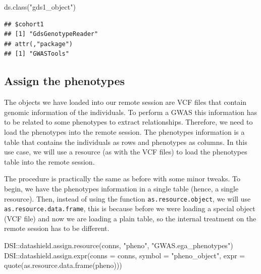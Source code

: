 \documentclass[
]{book}
\newenvironment{Shaded}{\begin{snugshade}}{\end{snugshade}}
\newcommand{\AttributeTok}[1]{\textcolor[rgb]{0.77,0.63,0.00}{#1}}
\newcommand{\FunctionTok}[1]{\textcolor[rgb]{0.00,0.00,0.00}{#1}}
\newcommand{\NormalTok}[1]{#1}
\newcommand{\SpecialCharTok}[1]{\textcolor[rgb]{0.00,0.00,0.00}{#1}}
\newcommand{\StringTok}[1]{\textcolor[rgb]{0.31,0.60,0.02}{#1}}
\begin{document}
\begin{Shaded}
\begin{Highlighting}[]
\FunctionTok{ds.class}\NormalTok{(}\StringTok{"gds1\_object"}\NormalTok{)}
\end{Highlighting}
\end{Shaded}

\begin{verbatim}
## $cohort1
## [1] "GdsGenotypeReader"
## attr(,"package")
## [1] "GWASTools"
\end{verbatim}

\hypertarget{assign-the-phenotypes}{%
\subsection{Assign the phenotypes}\label{assign-the-phenotypes}}

The objects we have loaded into our remote session are VCF files that contain genomic information of the individuals. To perform a GWAS this information has to be related to some phenotypes to extract relationships. Therefore, we need to load the phenotypes into the remote session. The phenotypes information is a table that contains the individuals as rows and phenotypes as columns. In this use case, we will use a resource (as with the VCF files) to load the phenotypes table into the remote session.

The procedure is practically the same as before with some minor tweaks. To begin, we have the phenotypes information in a single table (hence, a single resource). Then, instead of using the function \texttt{as.resource.object}, we will use \texttt{as.resource.data.frame}, this is because before we were loading a special object (VCF file) and now we are loading a plain table, so the internal treatment on the remote session has to be different.

\begin{Shaded}
\begin{Highlighting}[]
\NormalTok{DSI}\SpecialCharTok{::}\FunctionTok{datashield.assign.resource}\NormalTok{(conns, }\StringTok{"pheno"}\NormalTok{, }\StringTok{"GWAS.ega\_phenotypes"}\NormalTok{)}
\NormalTok{DSI}\SpecialCharTok{::}\FunctionTok{datashield.assign.expr}\NormalTok{(}\AttributeTok{conns =}\NormalTok{ conns, }\AttributeTok{symbol =} \StringTok{"pheno\_object"}\NormalTok{,}
                            \AttributeTok{expr =} \FunctionTok{quote}\NormalTok{(}\FunctionTok{as.resource.data.frame}\NormalTok{(pheno)))}
\end{Highlighting}
\end{Shaded}
\end{document}
